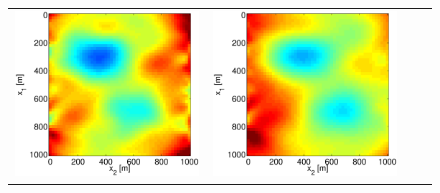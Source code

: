 \documentclass{iopart}
\begin{document}
\begin{figure}
\begin{tabular}{cccc}
\includegraphics[scale=.2]{./figs/2D_exp4_e}&
\includegraphics[scale=.2]{./figs/2D_exp4_f}&

\end{tabular}
\end{figure}
\end{document}
